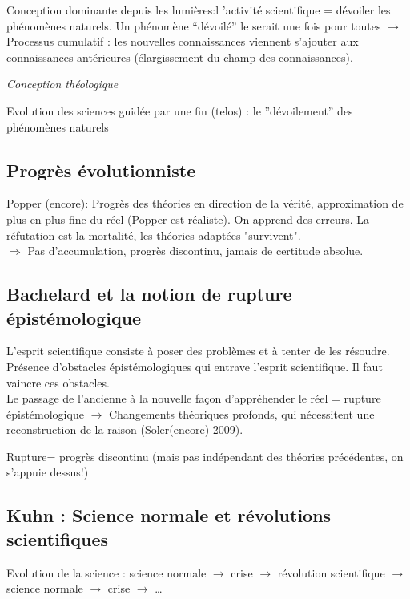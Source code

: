 \documentclass{report}
\begin{document}
	Conception dominante depuis les lumières:l ’activité scientifique = dévoiler les phénomènes naturels. Un phénomène “dévoilé” le serait une fois pour toutes $\rightarrow$ Processus cumulatif : les nouvelles connaissances viennent s’ajouter aux connaissances antérieures (élargissement du champ des connaissances).
	
	\emph{Conception théologique}
	
	Evolution des sciences guidée par une fin (telos) : le ”dévoilement” des phénomènes naturels
	
	\subsection{Progrès évolutionniste}
	
	Popper (encore): Progrès des théories en direction de la vérité, approximation de plus en plus fine du réel (Popper est réaliste). On apprend des erreurs. La réfutation est la mortalité, les théories adaptées "survivent".\\
	$\Rightarrow$ Pas d'accumulation, progrès discontinu, jamais de certitude absolue.
	
	\subsection[Rupture épistémologique]{Bachelard et la notion de rupture épistémologique}
	
	L’esprit scientifique consiste à poser des problèmes et à tenter de les résoudre. Présence d’obstacles épistémologiques qui entrave l’esprit scientifique. Il faut vaincre ces obstacles.\\
	Le passage de l’ancienne à la nouvelle façon d’appréhender le réel = rupture épistémologique $\rightarrow$ Changements théoriques profonds, qui nécessitent une reconstruction de la raison (Soler(encore) 2009).
	
	Rupture= progrès discontinu (mais pas indépendant des théories précédentes, on s'appuie dessus!)
	
	\subsection[Science normale et révolution]{Kuhn : Science normale et révolutions scientifiques}
	
	Evolution de la science : science normale $\rightarrow$ crise $\rightarrow$ révolution scientifique $\rightarrow$ science normale $\rightarrow$ crise $\rightarrow$ … 
	
\end{document}
